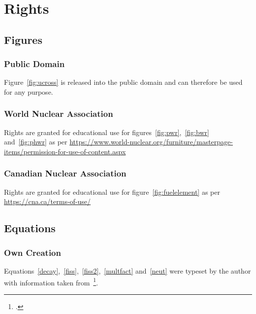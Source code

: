 \chapter{Rights}
\section{Figures}
\subsection{Public Domain}
Figure~\ref{fig:ucross} is released into the public domain and can therefore be used for any purpose.
\subsection{World Nuclear Association}
Rights are granted for educational use for figures~\ref{fig:pwr},~\ref{fig:bwr} and~\ref{fig:phwr}
as per \url{https://www.world-nuclear.org/furniture/masterpage-items/permission-for-use-of-content.aspx}
\subsection{Canadian Nuclear Association}
Rights are granted for educational use for figure~\ref{fig:fuelelement} as per
\url{https://cna.ca/terms-of-use/}
\section{Equations}
\subsection{Own Creation}
Equations~\ref{decay},~\ref{fiss},~\ref{fiss2},~\ref{multfact} and~\ref{neut} were typeset by the author with
information taken from~\footcite{ReactorDesign}.
